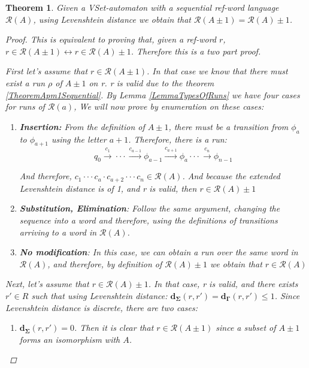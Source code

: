 \documentclass{article}
\newcommand{\trans}[1]{\overset{#1}{\longrightarrow}}
\newtheorem{theorem}{Theorem}
\begin{document}
\begin{theorem} \label{TheoremAutomatonPM1}
    Given a VSet-automaton with a sequential ref-word language
    $\mathcal{R}(A)$, using Levenshtein distance we obtain that
    $\mathcal{R}(A \pm 1) = \mathcal{R}(A) \pm 1$.

    \begin{proof}
	This is equivalent to proving that, given a ref-word $r$,
	$r \in \mathcal{R}(A \pm 1) \leftrightarrow r \in
	\mathcal{R}(A)\pm 1$. Therefore this is a two part proof.

	First let's assume that $r \in \mathcal{R}(A \pm 1)$. In
	that case we know that there must exist a run $\rho$ of $A
    \pm 1$ on r. r is valid due to the theorem \ref{TheoremApm1Sequential}.
        By Lemma \ref{LemmaTypesOfRuns} we have four cases for runs of $\mathcal{R}(a)$, We will now prove by enumeration on these cases:
    \begin{enumerate}
        \item \textbf{Insertion:} From the definition of $A \pm 1$, there must be a transition from $\phi_a$ to $\phi_{a+1}$ using the letter $a + 1$. Therefore, there is a run:
        \begin{equation*}
            q_0 \trans{c_1} \cdot\cdot\cdot\trans{c_{a-1}}\phi_{a-1} \trans{c_{a+1}} \phi_{a} \cdot\cdot\cdot \trans{c_n} \phi_{n - 1}
        \end{equation*}

	    And therefore, $c_1 \cdot\cdot\cdot c_a \cdot c_{a+2}
	    \cdot\cdot\cdot c_n \in \mathcal{R}(A)$. And because
	    the extended Levenshtein distance is of 1, and r is
	    valid, then $r \in \mathcal{R}(A) \pm 1$
            
    \item \textbf{Substitution, Elimination}: Follow the same argument, changing the sequence into a word and therefore, using the definitions of transitions arriving to a word in $\mathcal{R}(A)$.
        \item \textbf{No modification}: In this case, we can obtain a run over the same word
            in $\mathcal{R}(A)$, and therefore, by definition of $\mathcal{R}(A)
            \pm 1$ we obtain that $r \in \mathcal{R}(A)$
	    \end{enumerate}



        Next, let's assume that $r \in \mathcal{R}(A) \pm 1$. In that case, r is valid, and there exists $r' \in R$ such that using Levenshtein distance: $\mathbf{d_\Sigma}(r, r') = \mathbf{d_\Gamma}(r, r') \leq 1$. Since Levenshtein distance is discrete, there are two cases:
        \begin{enumerate}
            \item $\mathbf{d_\Sigma}(r, r') = 0$. Then it is clear
            that $r \in \mathcal{R}(A \pm 1)$ since a subset of $A
            \pm 1$ forms an isomorphism with $A$.


\end{enumerate}
\end{proof}
\end{theorem}
\end{document}
